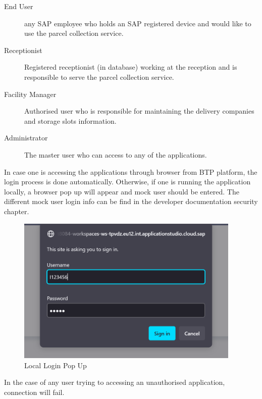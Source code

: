 \begin{description}
	\item[End User] any SAP employee who holds an SAP registered device and would like to use the parcel collection service.
	\item[Receptionist] Registered receptionist (in database) working at the reception and is responsible to serve the parcel collection service.
	\item[Facility Manager] Authorised user who is responsible for maintaining the delivery companies and storage slots information.
	\item[Administrator] The master user who can access to any of the applications.
\end{description}

In case one is accessing the applications through browser from BTP platform, the login process is done automatically. Otherwise, if one is running the application locally, a browser pop up will appear and mock user should be entered. The different mock user login info can be find in the developer documentation security chapter.

\begin{figure}[H]
	\centering
	\includegraphics[height=200pt]{images/user_doc/overviews/localLogin.png}
	\caption{Local Login Pop Up}
	\label{fig:LocalLoginPopUp}
\end{figure}

In the case of any user trying to accessing an unauthorised application, connection will fail.

